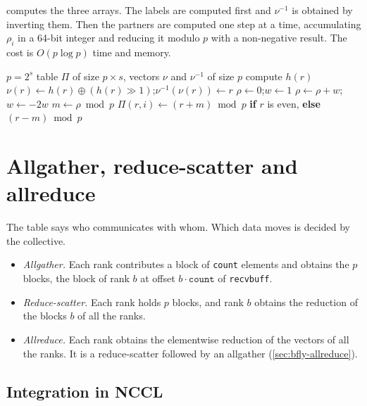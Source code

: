  computes the three arrays.
The labels are computed first and $\nu^{-1}$ is obtained by inverting them. Then the partners are computed one step at a time, accumulating $\rho_i$ in a 64-bit integer and reducing it modulo $p$ with a non-negative result.
The cost is $O(p\log p)$ time and memory.

\begin{algorithm}[t]
\caption{Schedule of the distance-doubling \bine{} butterfly ($p=2^s$).}
\label{alg:bfly-schedule}
\begin{algorithmic}[1]
\Require $p=2^s$
\Ensure table $\Pi$ of size $p\times s$, vectors $\nu$ and $\nu^{-1}$ of size $p$
  \State compute $h(r)$ 
  \State $\nu(r)\gets h(r)\oplus(h(r)\gg1)$;\quad $\nu^{-1}(\nu(r))\gets r$
\EndFor
\State $\rho\gets0$;\quad $w\gets1$
  \State $\rho\gets\rho+w$;\quad $w\gets-2w$ 
  \State $m\gets\rho\bmod p$ 
    \State $\Pi(r,i)\gets (r+m)\bmod p$ \textbf{if} $r$ is even, \textbf{else} $(r-m)\bmod p$
  \EndFor
\EndFor
\end{algorithmic}
\end{algorithm}

\section{Allgather, reduce-scatter and allreduce}\label{sec:bfly-collectives}

The table says who communicates with whom. Which data moves is decided by the collective.
\begin{itemize}
  \item \emph{Allgather.} Each rank contributes a block of \texttt{count} elements and obtains the $p$ blocks, the block of rank $b$ at offset $b\cdot\texttt{count}$ of \texttt{recvbuff}.
  \item \emph{Reduce-scatter.} Each rank holds $p$ blocks, and rank $b$ obtains the reduction of the blocks $b$ of all the ranks.
  \item \emph{Allreduce.} Each rank obtains the elementwise reduction of the vectors of all the ranks. It is a reduce-scatter followed by an allgather (\cref{sec:bfly-allreduce}).
\end{itemize}

\subsection{Integration in NCCL}

